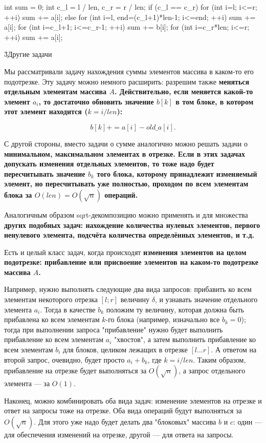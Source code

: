 \code
int sum = 0;
int c_l = l / len,   c_r = r / len;
if (c_l == c_r)
	for (int i=l; i<=r; ++i)
		sum += a[i];
else {
	for (int i=l, end=(c_l+1)*len-1; i<=end; ++i)
		sum += a[i];
	for (int i=c_l+1; i<=c_r-1; ++i)
		sum += b[i];
	for (int i=c_r*len; i<=r; ++i)
		sum += a[i];
}
\endcode


\h3{Другие задачи}

Мы рассматривали задачу нахождения суммы элементов массива в каком-то его подотрезке. Эту задачу можно немного расширить: разрешим также \bf{меняться} отдельным элементам массива $A$. Действительно, если меняется какой-то элемент $a_i$, то достаточно обновить значение $b[k]$ в том блоке, в котором этот элемент находится ($k = i / len$):

$$ b[k] += a[i] - old\_a[i]. $$

С другой стороны, вместо задачи о сумме аналогично можно решать задачи о \bf{минимальном, максимальном} элементах в отрезке. Если в этих задачах допускать изменения отдельных элементов, то тоже надо будет пересчитывать значение $b_k$ того блока, которому принадлежит изменяемый элемент, но пересчитывать уже полностью, проходом по всем элементам блока за $O(len) = O(\sqrt{n})$ операций.

Аналогичным образом sqrt-декомпозицию можно применять и для множества \bf{других} подобных задач: нахождение количества нулевых элементов, первого ненулевого элемента, подсчёта количества определённых элементов, и т.д.

Есть и целый класс задач, когда происходят \bf{изменения элементов на целом подотрезке}: прибавление или присвоение элементов на каком-то подотрезке массива $A$.

Например, нужно выполнять следующие два вида запросов: прибавить ко всем элементам некоторого отрезка $[l;r]$ величину $\delta$, и узнавать значение отдельного элемента $a_i$. Тогда в качестве $b_k$ положим ту величину, которая должна быть прибавлена ко всем элементам $k$-го блока (например, изначально все $b_k = 0$); тогда при выполнении запроса "прибавление" нужно будет выполнить прибавление ко всем элементам $a_i$ "хвостов", а затем выполнить прибавление ко всем элементам $b_i$ для блоков, целиком лежащих в отрезке $[l \ldots r]$. А ответом на второй запрос, очевидно, будет просто $a_i + b_k$, где $k = i / len$. Таким образом, прибавление на отрезке будет выполняться за $O(\sqrt{n})$, а запрос отдельного элемента --- за $O(1)$.

Наконец, можно комбинировать оба вида задач: изменение элементов на отрезке и ответ на запросы тоже на отрезке. Оба вида операций будут выполняться за $O(\sqrt{n})$. Для этого уже надо будет делать два "блоковых" массива $b$ и $c$: один --- для обеспечения изменений на отрезке, другой --- для ответа на запросы.

